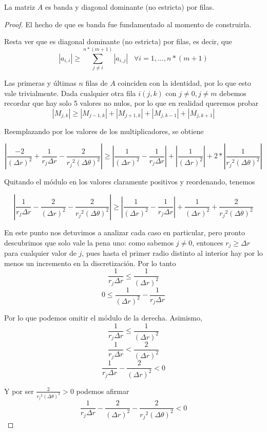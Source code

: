 \begin{proposition}

La matriz $A$ es banda y diagonal dominante (no estricta) por filas.

\begin{proof}

El hecho de que es banda fue fundamentado al momento de construirla.

Resta ver que es diagonal dominante (no estricta) por filas, es decir, que $$|a_{i, i}| \geq \sum\limits_{j \neq i}^{n*(m+1)} |a_{i, j}| \hspace{10pt} \forall i = 1, \ldots, n*(m+1)$$

Las primeras y últimas $n$ filas de $A$ coinciden con la identidad, por lo que esto vale trivialmente. Dada cualquier otra fila $i(j, k)$ con $j \neq 0, j \neq m$ debemos recordar que hay solo 5 valores no nulos, por lo que en realidad queremos probar $$|M_{j, k}| \geq |M_{j-1, k}| + |M_{j+1, k}| + |M_{j, k-1}| + |M_{j, k+1}|$$

Reemplazando por los valores de los multiplicadores, se obtiene

$$\left|\frac{-2}{(\Delta r)^2} + \frac{1}{r_j \Delta r} - \frac{2}{{r_j}^2 (\Delta \theta)^2}\right| \geq \left|\frac{1}{(\Delta r)^2} - \frac{1}{r_j \Delta r}\right| + \left|\frac{1}{(\Delta r)^2}\right| + 2 * \left|\frac{1}{{r_j}^2(\Delta \theta)^2}\right| $$

Quitando el módulo en los valores claramente positivos y reordenando, tenemos

$$\left|\frac{1}{r_j \Delta r} - \frac{2}{(\Delta r)^2} - \frac{2}{{r_j}^2 (\Delta \theta)^2}\right| \geq \left|\frac{1}{(\Delta r)^2} - \frac{1}{r_j \Delta r}\right| + \frac{1}{(\Delta r)^2} + \frac{2}{{r_j}^2(\Delta \theta)^2} $$

En este punto nos detuvimos a analizar cada caso en particular, pero pronto descubrimos que solo vale la pena uno:
como sabemos $j \neq 0$, entonces $r_j \geq \Delta r$ para cualquier valor de $j$, pues hasta el primer radio distinto al interior hay por lo menos un incremento en la discretización. Por lo tanto 
$$\frac{1}{r_j \Delta r} \leq \frac{1}{(\Delta r)^2}$$
$$0 \leq \frac{1}{(\Delta r)^2} - \frac{1}{r_j \Delta r}$$

Por lo que podemos omitir el módulo de la derecha. Asimismo, 
$$ \frac{1}{r_j \Delta r} \leq \frac{1}{(\Delta r)^2} $$
$$ \frac{1}{r_j \Delta r} < \frac{2}{(\Delta r)^2} $$
$$ \frac{1}{r_j \Delta r} - \frac{2}{(\Delta r)^2} < 0 $$

Y por ser $\frac{2}{{r_j}^2 (\Delta \theta)^2} > 0$ podemos afirmar
$$ \frac{1}{r_j \Delta r} - \frac{2}{(\Delta r)^2} - \frac{2}{{r_j}^2 (\Delta \theta)^2} < 0 $$


\end{proof}
\end{proposition}
